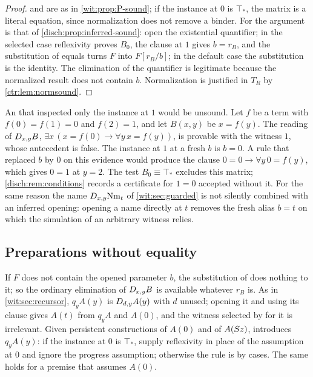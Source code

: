 \begin{proof}
 and  are as in \cref{wit:prop:P-sound}; if
the instance at $0$ is $\top_{*}$, the matrix is a literal equation, since
normalization does not remove a binder.  For  the argument
is that of \cref{disch:prop:inferred-sound}: open the existential
quantifier; in the selected case reflexivity proves $B_0$, the clause at $1$
gives $b=r_B$, and the substitution of equals turns $F$ into $F[r_B/b]$; in
the default case the substitution is the identity.  The elimination of the
quantifier is legitimate because the normalized result does not contain
$b$.  Normalization is justified in $T_R$ by \cref{ctr:lem:normsound}.
\end{proof}

\begin{example}
\label{wit:ex:first-row}
An  that inspected only the instance at $1$ would be
unsound.  Let $f$ be a term with $f(0)=f(1)=0$ and $f(2)=1$, and let
$B(x,y)$ be $x=f(y)$.  The reading of $D_{x,y}B$,
$\exists x\,(x=f(0)\to\forall y\,x=f(y))$, is provable with the witness $1$,
whose antecedent is false.  The instance at $1$ at a fresh $b$ is $b=0$.  A
rule that replaced $b$ by $0$ on this evidence would produce the clause
$0=0\to\forall y\,0=f(y)$, which gives $0=1$ at $y=2$.  The test
$B_0\equiv\top_{*}$ excludes this matrix; \cref{disch:rem:conditions}
records a certificate for $1=0$ accepted without it.  For the same reason
the name
$D_{x,y}\mathrm{Nm}_t$ of \cref{wit:sec:guarded} is not silently combined
with an inferred opening: opening a name directly at $t$ removes the fresh
alias $b=t$ on which the simulation of an arbitrary witness relies.
\end{example}

\subsection{Preparations without equality}
\label{wit:sec:copy-prep}

If $F$ does not contain the opened parameter $b$, the substitution of
 does nothing to it; so the ordinary elimination of
$D_{x,y}B$ is available whatever $r_B$ is.  As in
\cref{wit:sec:recursor}, $q_yA(y)$ is $D_{d,y}A(y)$ with $d$ unused;
opening it and using its clause gives $A(t)$ from $q_yA$ and $A(0)$, and the
witness selected by  for it is irrelevant.  Given persistent
constructions of $A(0)$ and of $A(S z)$,  introduces
$q_yA(y)$: if the instance at $0$ is $\top_{*}$, supply reflexivity in place
of the assumption at $0$ and ignore the progress assumption; otherwise the
rule is by cases.  The same holds for a premise that assumes $A(0)$.

